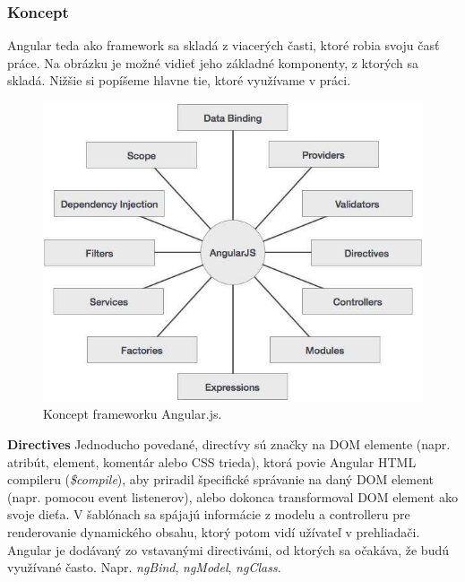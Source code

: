 \subsubsection{Koncept}
Angular teda ako framework sa skladá z viacerých časti, ktoré robia svoju časť práce. Na obrázku je možné vidieť jeho základné komponenty, z ktorých sa skladá. Nižšie si popíšeme hlavne tie, ktoré využívame v práci.\cite{angular-concept}

\begin{figure}[H]
  \centering
  \includegraphics[scale=0.5]{img/angular/angularjs_concepts.jpg}
  \caption{Koncept frameworku Angular.js.}
  \label{img-angular-concept}
\end{figure}

\textbf{Directives}\label{angular-directives}
Jednoducho povedané, directívy sú značky na DOM elemente (napr. atribút, element, komentár alebo CSS trieda), ktorá povie Angular HTML compileru (\textit{\$compile}), aby priradil špecifické správanie na daný DOM element (napr. pomocou event listenerov), alebo dokonca transformoval DOM element ako svoje dieťa. V šablónach sa spájajú informácie z modelu a controlleru pre renderovanie dynamického obsahu, ktorý potom vidí užívateľ v prehliadači.
Angular je dodávaný zo vstavanými directivámi, od ktorých sa očakáva, že budú využívané často. Napr. \textit{ngBind}, \textit{ngModel}, \textit{ngClass}.\cite{angular-docs}

